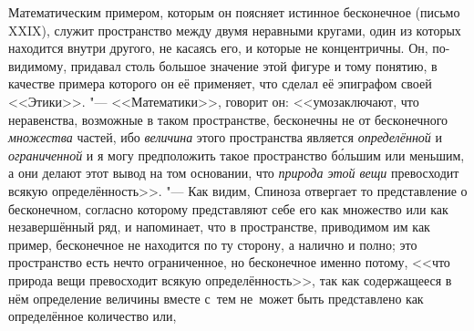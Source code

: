 Математическим примером, которым он поясняет истинное бесконечное (письмо
XXIX), служит пространство между двумя неравными кругами, один из которых
находится внутри другого, не касаясь его, и которые не концентричны. Он,
по-видимому, придавал столь большое значение этой фигуре и тому понятию,
в качестве примера которого он её
применяет, что сделал её эпиграфом своей <<Этики>>. "--- <<Математики>>, говорит он: <<умозаключают, что
неравенства, возможные в таком пространстве, бесконечны не от бесконечного
{\em множества} частей, ибо {\em величина} этого пространства является
{\em определённой} и {\em ограниченной} и я могу предположить такое
пространство б\'{о}льшим или меньшим, а они делают этот вывод на том основании,
что {\em природа этой вещи} превосходит всякую
определённость>>. "--- Как
видим, Спиноза отвергает то представление о бесконечном, согласно которому
представляют себе его как множество или как незавершённый ряд, и напоминает,
что в пространстве, приводимом им как пример, бесконечное не находится по ту
сторону, а налично и полно; это пространство есть нечто ограниченное, но
бесконечное именно потому, <<что природа вещи превосходит всякую
определённость>>, так как содержащееся в нём определение величины вместе с~тем
не~может быть представлено как определённое количество или,
